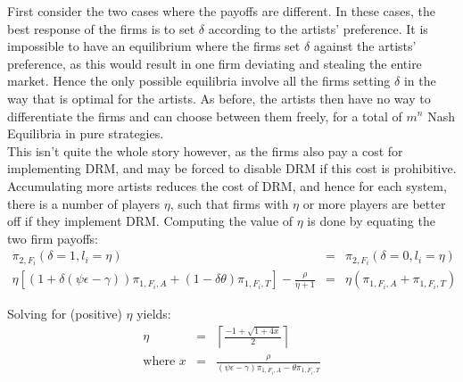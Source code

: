 \documentclass[a4paper,12pt]{article}
\numberwithin{equation}{section}
\newcommand{\firmpayoff}[2]{\pi_{{#1}, F_{#2}}}
\newcommand{\firmalbum}[2]{\pi_{#1, F_{#2}, A}}
\newcommand{\firmticket}[2]{\pi_{#1, F_{#2}, T}}
\newcommand{\drminf}{(\psi \epsilon - \gamma)}
\def\lc{\left\lceil}
\def\rc{\right\rceil}
\begin{document}
First consider the two cases where the payoffs are different. In these cases, the best response of the firms is to set $\delta$ according to the artists' preference. It is impossible to have an equilibrium where the firms set $\delta$ against the artists' preference, as this would result in one firm deviating and stealing the entire market. Hence the only possible equilibria involve all the firms setting $\delta$ in the way that is optimal for the artists. As before, the artists then have no way to differentiate the firms and can choose between them freely, for a total of $m^n$ Nash Equilibria in pure strategies.\\

This isn't quite the whole story however, as the firms also pay a cost for implementing DRM, and may be forced to disable DRM if this cost is prohibitive. Accumulating more artists reduces the cost of DRM, and hence for each system, there is a number of players $\eta$, such that firms with $\eta$ or more players are better off if they implement DRM. Computing the value of $\eta$ is done by equating the two firm payoffs:
\begin{eqnarray*}
\firmpayoff{2}{i}(\delta = 1, l_i = \eta) & = & \firmpayoff{2}{i}(\delta = 0, l_i = \eta)\\
\eta \left[\left(1 + \delta \drminf\right) \firmalbum{1}{i} + (1 - \delta \theta) \firmticket{1}{i}\right] - \frac{\rho}{\eta + 1} & = & \eta (\firmalbum{1}{i} + \firmticket{1}{i})
\end{eqnarray*}

Solving for (positive) $\eta$ yields:
\begin{eqnarray}
\eta & = & \lc \frac{-1 + \sqrt{1 + 4 x}}{2} \rc \\
\text{where } x & = & \frac{\rho}{\drminf \firmalbum{1}{i} - \theta \firmticket{1}{i}} \nonumber
\end{eqnarray}
\end{document}
